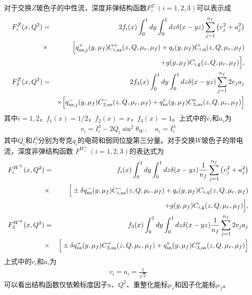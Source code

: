 对于交换$Z$玻色子的中性流，深度非弹结构函数$F^Z_i~(i=1,2,3)$可以表示成
\begin{eqnarray}
\label{eq:DISF-Z}
F_{i}^{Z}(x, Q^2)
&=&
2 f_i(x)
\int_0^1 d y \int_0^1 d z \delta(x - y z) \sum_{j=1}^{n_f} \left( v_j^2 + a_j^2 \right) \nonumber \\
&\times&
\Big[
q^{+}_{{\rm ns}, j}(y, \mu_f) C^{+}_{i, {\rm ns}}(z, Q, \mu_r, \mu_f)
+
q_{{\rm s}}(y, \mu_f) C_{i, {\rm q}}(z, Q, \mu_r, \mu_f)
\nonumber \\
&& +
g(y, \mu_f) C_{i, {\rm g}}(z, Q, \mu_r, \mu_f)
\Big], \nonumber \\
F_{3}^{Z}(x, Q^2)
&=&
2 f_3(x)
\int_0^1 d y \int_0^1 d z \delta(x - y z) \sum_{j=1}^{n_f} 2 v_j a_j \nonumber \\
&&
\times
\Big[
q^{-}_{{\rm ns}, j}(y, \mu_f) C^{-}_{3, {\rm ns}}(z, Q, \mu_r, \mu_f)
+
q_{{\rm ns}}^{{\rm v}}(y, \mu_f) C_{3, {\rm ns}}^{{\rm v}}(z, Q, \mu_r, \mu_f)
\Big]
\nonumber \\
\end{eqnarray}
其中$i=1,2$，$f_1(x) = 1/2$，$f_2(x) = x$，$f_3(x) = 1$。上式中的$v_i$和$a_i$为
\begin{eqnarray}
v_i = I_i^3 - 2 Q_i \sin^2\theta_W \,,\quad
a_i = I_i^3
\end{eqnarray}
其中$Q_i$和$I^3_i$分别为夸克$q_i$的电荷和弱同位旋第三分量。对于交换$W$玻色子的带电流，深度非弹结构函数
$F^{W^{\pm}_i}~(i=1,2,3)$的表达式为
\begin{eqnarray}
\label{eq:DISF-W}
F_{i}^{W^{\mp}}(x, Q^2)
&=&
f_i(x)
\int_0^1 d y \int_0^1 d z \delta(x - y z) \frac{1}{n_f} \sum_{j=1}^{n_f} \left( v_j^2 + a_j^2 \right) \nonumber \\
&\times&
\Big[
\pm \delta q^{-}_{{\rm ns}}(y, \mu_f) C^{-}_{i, {\rm ns}}(z, Q, \mu_r, \mu_f)
+
q_{{\rm s}}(y, \mu_f) C_{i, {\rm q}}(z, Q, \mu_r, \mu_f)
\nonumber \\
&&+ g(y, \mu_f) C_{i, {\rm g}}(z, Q, \mu_r, \mu_f)
\Big], \nonumber \\
F_{3}^{W^{\mp}}(x, Q^2)
&=&
f_3(x)
\int_0^1 d y \int_0^1 d z \delta(x - y z) \frac{1}{n_f} \sum_{j=1}^{n_f} 2 v_j a_j \nonumber \\
&\times&
\Big[
\pm \delta q^{+}_{{\rm ns}}(y, \mu_f) C^{+}_{3, {\rm ns}}(z, Q, \mu_r, \mu_f)
+
q_{{\rm ns}}^{{\rm v}}(y, \mu_f) C_{3, {\rm ns}}^{{\rm v}}(z, Q, \mu_r, \mu_f)
\Big] \nonumber \\
\end{eqnarray}
上式中的$v_i$和$a_i$为
\begin{eqnarray}
v_i = a_i = \frac{1}{\sqrt{2}}
\end{eqnarray}
可以看出结构函数仅依赖标度因子x、$Q^2$、重整化能标$\mu_r$和因子化能标$\mu_f$。

